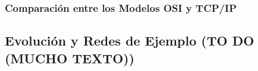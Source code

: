 \subsubsection{Comparación entre los Modelos OSI y TCP/IP}

\subsection{Evolución y Redes de Ejemplo (TO DO (MUCHO TEXTO))}